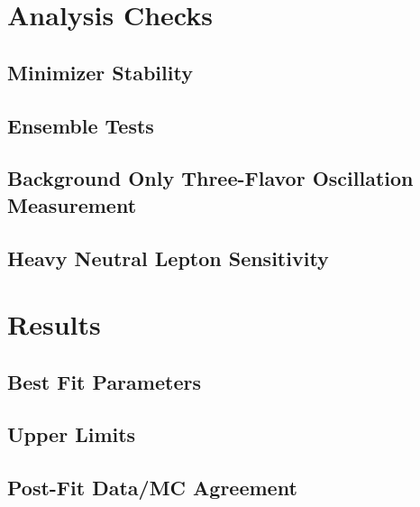 


\section{Analysis Checks}

\subsection{Minimizer Stability}

\subsection{Ensemble Tests}

\subsection{Background Only Three-Flavor Oscillation Measurement}

\subsection{Heavy Neutral Lepton Sensitivity}



\section{Results}

\subsection{Best Fit Parameters}

\subsection{Upper Limits}

\subsection{Post-Fit Data/MC Agreement}
